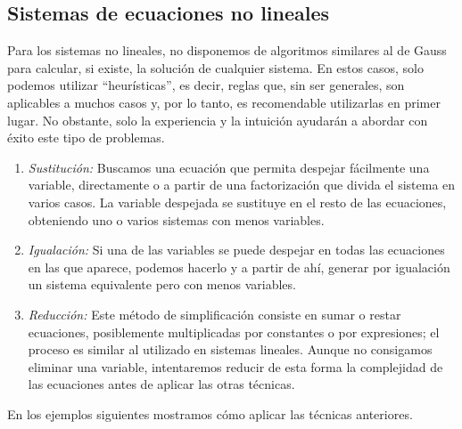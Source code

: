 

\subsection{Sistemas de ecuaciones no lineales}

Para los sistemas no lineales, no disponemos de algoritmos similares al de Gauss para calcular, si existe, la solución de cualquier sistema.
En estos casos, solo podemos utilizar ``heurísticas'', es decir, reglas que, sin ser generales, son aplicables a muchos casos y, por lo tanto, es recomendable utilizarlas en primer lugar.
No obstante, solo la experiencia y la intuición ayudarán a abordar con éxito este tipo de problemas.
%
\begin{enumerate}
\item
\emph{Sustitución:}
Buscamos una ecuación que permita despejar fácilmente una variable, directamente o a partir de una factorización que divida el sistema en varios casos.
La variable despejada se sustituye en el resto de las ecuaciones, obteniendo uno o varios sistemas con menos variables.
\item
\emph{Igualación:}
Si una de las variables se puede despejar en todas las ecuaciones en las que aparece, podemos hacerlo y a partir de ahí, generar por igualación un sistema equivalente pero con menos variables.

\item
\emph{Reducción:}
Este método de simplificación consiste en sumar o restar ecuaciones, posiblemente multiplicadas por constantes o por expresiones; el proceso es similar al utilizado en sistemas lineales.
Aunque no consigamos eliminar una variable, intentaremos reducir de esta forma la complejidad de las ecuaciones antes de aplicar las otras técnicas.
\end{enumerate}

En los ejemplos siguientes mostramos cómo aplicar las técnicas anteriores.

